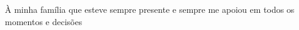 \begin{dedication}
À minha família que esteve sempre presente e sempre me apoiou em todos os momentos e decisões
\end{dedication}
\clearpage
\thispagestyle{empty}
\cleardoublepage